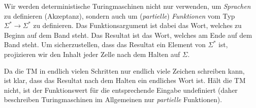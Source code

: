 Wir werden deterministische Turingmaschinen nicht nur verwenden, um \emph{Sprachen} zu definieren (Akzeptanz), sondern auch um (\emph{partielle}) \emph{Funktionen} vom Typ $\Sigma^*\rightarrow\Sigma^*$ zu definieren.
Das Funktionsargument ist dabei das Wort, welches zu Beginn auf dem Band steht.
Das Resultat ist das Wort, welches am Ende auf dem Band steht.
Um sicherzustellen, dass das Resultat ein Element von $\Sigma^*$ ist, projizieren wir den Inhalt jeder Zelle nach dem Halten auf $\Sigma$.

Da die \ac{TM} in endlich vielen Schritten nur endlich viele Zeichen schreiben kann, ist klar, dass das Resultat nach dem Halten ein endliches Wort ist.
Hält die \ac{TM} nicht, ist der Funktionswert für die entsprechende Eingabe undefiniert (daher beschreiben Turingmaschinen im Allgemeinen nur \emph{partielle} Funktionen).



\goodbreak

